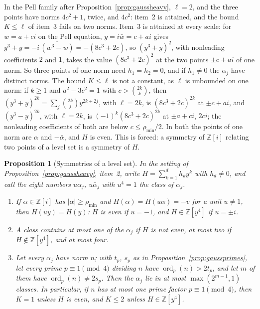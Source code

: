 \documentclass[11pt]{article}
\newtheorem{proposition}[theorem]{Proposition}
\begin{document}
In the Pell family after Proposition~\ref{prop:gaussheavy}, $\ell=2$, and
the three points have norms $4c^2+1$, twice, and $4c^2$: item~2 is attained,
and the bound $K\le\ell$ of item~3 fails on two norms.  Item~3 is attained
at every scale: for $w=a+ci$ on the Pell equation, $y=i\bar w=c+ai$ gives
$y^3+y=-i\,\overline{(w^3-w)}=-(8c^3+2c)$, so $(y^3+y)^2$, with nonleading
coefficients $2$ and $1$, takes the value $(8c^3+2c)^2$ at the two points
$\pm c+ai$ of one norm.  So three points of one norm need $h_1=h_2=0$, and
if $h_1\ne0$ the $\alpha_j$ have distinct norms.  The bound $K\le\ell$ is
not a constant, as $\ell$ is unbounded on one norm: if $k\ge1$ and
$a^2-3c^2=1$ with $c>\binom{2k}k$, then $(y^3+y)^{2k}=\sum_j\binom{2k}jy^{2k+2j}$, with
$\ell=2k$, is $(8c^3+2c)^{2k}$ at $\pm c+ai$, and $(y^3-y)^{2k}$, with
$\ell=2k$, is $(-1)^k(8c^3+2c)^{2k}$ at $\pm a+ci$, $2ci$; the nonleading
coefficients of both are below $c\le\rho_{\min}/2$.  In both the points of one
norm are $\alpha$ and $-\bar\alpha$, and $H$ is even.  This is forced: a
symmetry of $\mathbb Z[i]$ relating two points of a level set is a symmetry
of $H$.

\begin{proposition}[Symmetries of a level set]\label{prop:gausssym}
In the setting of Proposition~\ref{prop:gaussheavy}, item~2, write
$H=\sum_{k=1}^dh_ky^k$ with $h_d\ne0$, and call the eight numbers
$u\alpha_j$, $u\bar\alpha_j$ with $u^4=1$ the \emph{class} of $\alpha_j$.
\begin{enumerate}
\item If $\alpha\in\mathbb Z[i]$ has $|\alpha|\ge\rho_{\min}$ and
$H(\alpha)=H(u\alpha)=-v$ for a unit $u\ne1$, then $H(uy)=H(y)$: $H$ is
even if $u=-1$, and $H\in\mathbb Z[y^4]$ if $u=\pm i$.
\item A class contains at most one of the $\alpha_j$ if $H$ is not even, at
most two if $H\notin\mathbb Z[y^4]$, and at most four.
\item Let every $\alpha_j$ have norm $n$; with $t_p$, $s_p$ as in
Proposition~\ref{prop:gaussprimes}, let every prime $p\equiv1\pmod4$
dividing $n$ have $\operatorname{ord}_p(n)>2t_p$, and let $m$ of them have
$\operatorname{ord}_p(n)\ne2s_p$.  Then the $\alpha_j$ lie in at most
$\max(2^{m-1},1)$ classes.  In particular, if $n$ has at most one prime
factor $p\equiv1\pmod4$, then $K=1$ unless $H$ is even, and $K\le2$ unless
$H\in\mathbb Z[y^4]$.
\end{enumerate}
\end{proposition}
\end{document}
